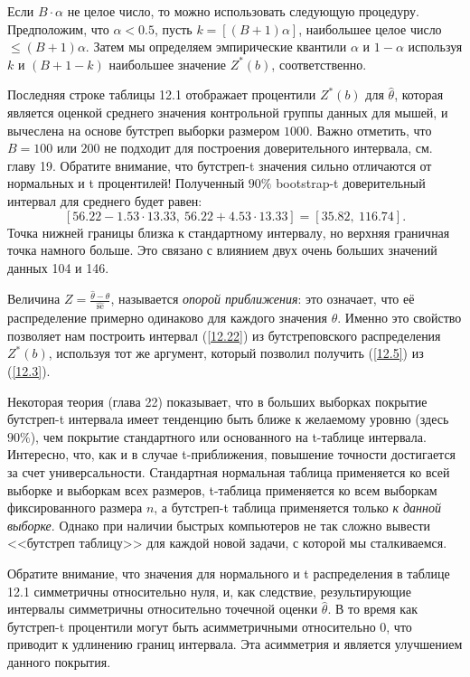 Если $B \cdot \alpha $  не целое число, то можно использовать следующую процедуру. Предположим, что $\alpha < 0.5$, пусть $k = [(B + 1) \alpha]$, наибольшее целое число $\le(B + 1) \alpha$.
Затем мы определяем эмпирические квантили $\alpha $ и $1 - \alpha$ используя
$k$ и $(B + 1 - k)$ наибольшее значение $Z^{*}(b)$, соответственно. 
 
Последняя строке таблицы 12.1 отображает процентили $Z^{*}(b)$ для $\widehat{\theta}$, которая является оценкой среднего значения контрольной группы данных для мышей, и вычеслена на основе бутстреп выборки размером $1000$. Важно отметить, что $B = 100$ или $200$ не подходит для построения доверительного интервала, см. главу 19. Обратите внимание, что бутстреп-t значения сильно отличаются от нормальных и t процентилей! Полученный $90 \%$ bootstrap-t доверительный интервал для среднего будет равен:
$$
[56.22- 1.53 \cdot 13.33, \ 56.22 + 4.53 \cdot 13.33] = [35.82, \ 116.74].
$$
Точка нижней границы близка к стандартному интервалу, но верхняя граничная точка намного больше. Это связано с влиянием двух очень больших значений данных 104 и 146.

Величина $Z = \frac{\widehat{\theta} - {\theta}}{\widehat{\text{se}}}$, называется \textit{опорой приближения}: это означает, что её распределение примерно одинаково для каждого значения $\theta$. Именно это свойство позволяет нам построить интервал (\ref{12.22}) из бутстреповского распределения $Z^{*}(b)$, используя тот же аргумент, который позволил получить (\ref{12.5}) из (\ref{12.3}).

Некоторая теория (глава 22) показывает, что в больших выборках покрытие бутстреп-t интервала имеет тенденцию быть ближе к желаемому уровню (здесь $90 \%$), чем покрытие стандартного или основанного на t-таблице интервала. Интересно, что, как и в случае t-приближения, повышение точности достигается за счет универсальности. Стандартная нормальная таблица применяется ко всей выборке и выборкам всех размеров, t-таблица применяется ко всем выборкам фиксированного размера $n$, а бутстреп-t таблица применяется только \textit{к данной выборке}. Однако при наличии быстрых компьютеров не так сложно вывести <<бутстреп таблицу>> для каждой новой задачи, с которой мы сталкиваемся.

Обратите внимание, что значения для нормального и t распределения в таблице 12.1 симметричны относительно нуля, и, как следствие, результирующие интервалы симметричны относительно точечной оценки $\widehat{\theta}$. В то время как бутстреп-t процентили  могут быть асимметричными относительно 0, что приводит к удлинению границ интервала. Эта асимметрия и является улучшением данного покрытия.

